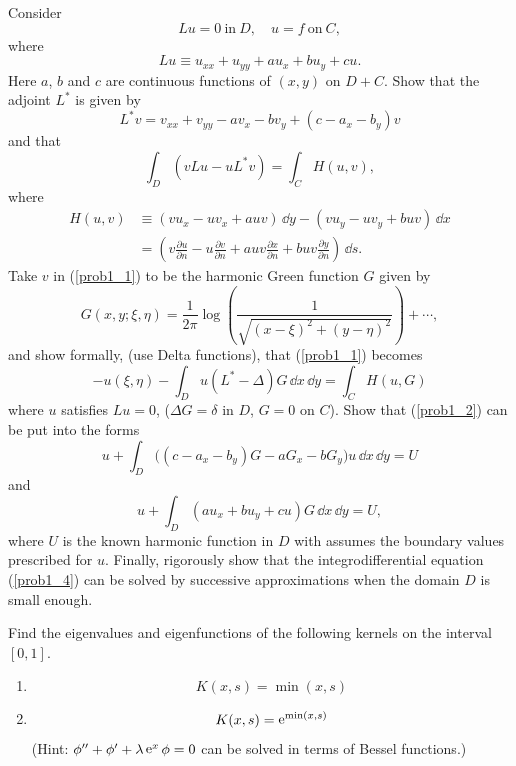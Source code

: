\begin{Exercise}
  Consider
  \[
  L u = 0\ \mathrm{in}\ D, \quad u = f\ \mathrm{on}\ C,
  \]
  where
  \[
  L u \equiv u_{x x} + u_{y y} + a u_x + b u_y + c u.
  \]
  Here $a$, $b$ and $c$ are continuous functions of $(x,y)$ on $D+C$.  Show 
  that the adjoint $L^*$ is given by 
  \[
  L^* v = v_{x x} + v_{y y} - a v_x - b v_y + (c - a_x - b_y) v
  \]
  and that 
  \begin{equation}
    \label{prob1_1}
    \int_D ( v L u - u L^* v) = \int_C H(u,v),
  \end{equation}
  where
  \begin{align*}
    H(u,v) &\equiv (v u_x - u v_x + a u v)\,\dd y - (v u_y - u v_y + b u v)\,\dd x \\
    &= \left( v \frac{\partial u}{\partial n} - u \frac{\partial v}{\partial n} + a u v \frac{\partial x}{\partial n}
      + b u v \frac{\partial y}{\partial n} \right) \,\dd s.
  \end{align*}
  Take $v$ in (\ref{prob1_1}) to be the harmonic Green function $G$ given by
  \[
  G(x,y;\xi,\eta) = \frac{1}{2\pi} \log \left( \frac{1}
    { \sqrt{ (x-\xi)^2 + (y-\eta)^2 } } \right) + \cdots,
  \]
  and show formally, (use Delta functions), that (\ref{prob1_1}) becomes
  \begin{equation}
    \label{prob1_2}
    - u(\xi,\eta) - \int_D u (L^* - \Delta) G \,\dd x \,\dd y = 
    \int_C H(u,G)
  \end{equation}
  where $u$ satisfies $L u = 0$, ($\Delta G = \delta$ in $D$, $G = 0$ on $C$).
  Show that (\ref{prob1_2}) can be put into the forms
  \begin{equation}
    \label{prob1_3}
    u + \int_D \big( (c - a_x - b_y) G - a G_x - b G_y \big) u \,\dd x \,\dd y = U
  \end{equation}
  and
  \begin{equation}
    \label{prob1_4}
    u + \int_D ( a u_x + b u_y + c u ) G \,\dd x \,\dd y = U,
  \end{equation}
  where $U$ is the known harmonic function in $D$ with assumes the boundary 
  values prescribed for $u$.  Finally, rigorously show that
  the integrodifferential equation (\ref{prob1_4}) can be solved by successive
  approximations when the domain $D$ is small enough.
\end{Exercise}



\begin{Exercise}
  Find the eigenvalues and eigenfunctions of the following kernels on 
  the interval $[0,1]$.
  \begin{enumerate}
  \item
    \[
    K(x,s) = \min(x,s)
    \]
  \item
    \[
    K(x,s) = \mathop{\mathrm{e}}\nolimits^{\min(x,s)}
    \]
    (Hint:  $\phi'' + \phi' + \lambda \mathop{\mathrm{e}}\nolimits^x \phi = 0$ can be solved in terms
    of Bessel functions.)
  \end{enumerate}
\end{Exercise}



